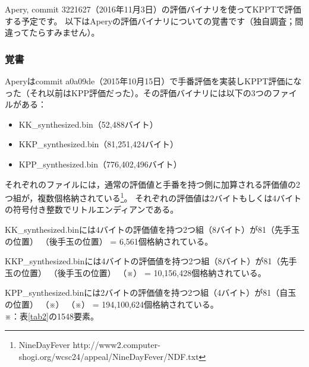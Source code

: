 \documentclass[11pt,a4paper]{ltjsarticle}
\begin{document}
Apery, commit 3221627（2016年11月3日）の評価バイナリを使ってKPPTで評価する予定です。
以下はAperyの評価バイナリについての覚書です（独自調査；間違ってたらすみません）。

\subsubsection*{覚書}
Aperyはcommit a0a09de（2015年10月15日）で手番評価を実装しKPPT評価になった（それ以前はKPP評価だった）。その評価バイナリには以下の3つのファイルがある：

\begin{itemize}
  \item KK\_synthesized.bin（52,488バイト）
  \item KKP\_synthesized.bin（81,251,424バイト）
  \item KPP\_synthesized.bin（776,402,496バイト）
\end{itemize}

それぞれのファイルには，通常の評価値と手番を持つ側に加算される評価値の2つ組が，複数個格納されている\footnote{NineDayFever http://www2.computer-shogi.org/wcsc24/appeal/NineDayFever/NDF.txt}。
それぞれの評価値は2バイトもしくは4バイトの符号付き整数でリトルエンディアンである。

KK\_synthesized.binには4バイトの評価値を持つ2つ組（8バイト）が81（先手玉の位置） （後手玉の位置） = 6,561個格納されている。

KKP\_synthesized.binには4バイトの評価値を持つ2つ組（8バイト）が81（先手玉の位置） （後手玉の位置） （※） = 10,156,428個格納されている。

KPP\_synthesized.binには2バイトの評価値を持つ2つ組（4バイト）が81（自玉の位置） （※） （※） = 194,100,624個格納されている。\\

※：表\ref{tab2}の1548要素。\\
\end{document}
